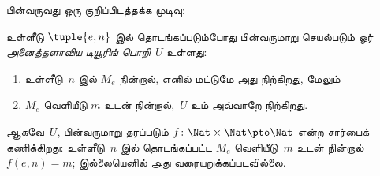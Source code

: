 \documentclass[../../../include/open-logic-section]{subfiles}
\begin{document}
பின்வருவது ஒரு குறிப்பிடத்தக்க முடிவு:

\begin{thm} உள்ளீடு $\tuple{e,n}$ இல்
  தொடங்கப்படும்போது பின்வருமாறு செயல்படும் ஓர்
  \emph{அனைத்தளாவிய டியூரிங் பொறி}~$U$ உள்ளது:
  \begin{enumerate}
    \item உள்ளீடு~$n$ இல் $M_e$ நின்றால், எனில் மட்டுமே அது நிற்கிறது, மேலும்
    \item $M_e$ வெளியீடு $m$ உடன் நின்றால்,~$U$ உம் அவ்வாறே நிற்கிறது.
  \end{enumerate}
  ஆகவே~$U$, பின்வருமாறு தரப்படும்
  $f\colon \Nat \times \Nat \pto \Nat$ என்ற சார்பைக் கணிக்கிறது:
  உள்ளீடு~$n$ இல் தொடங்கப்பட்ட $M_e$ வெளியீடு~$m$ உடன் நின்றால்
  $f(e,n) = m$; இல்லையெனில் அது வரையறுக்கப்படவில்லை.
\end{thm}
\end{document}
